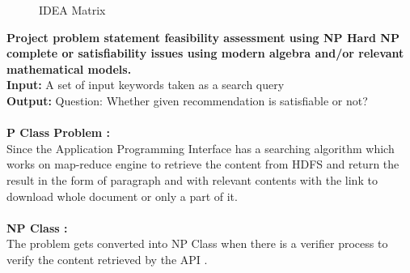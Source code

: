 \documentclass[oneside,a4paper,12pt]{report}
\begin{document}
{\begin{appendices}
  \begin{center}
	\begin{figure}[!htbp]
		\centering
	  \caption{IDEA Matrix}
	  \label{fig:arch-dig}
	\end{figure}
\end{center} 

\noindent  \textbf{Project problem statement feasibility assessment using NP Hard   NP complete or satisfiability issues  using modern algebra and/or relevant mathematical models.} \\

\noindent \textbf{Input:}  A set of input keywords taken as a search query  \\ 
\noindent \textbf{Output:} Question: Whether given recommendation is satisfiable or not? \\ \\

\noindent \textbf{P Class Problem : } \\
Since the Application Programming Interface has a searching algorithm which works on map-reduce engine to retrieve the content from HDFS and return the result in the form of paragraph and with relevant contents with the link to download whole document or only a part of it. \\ \\

\noindent \textbf{NP Class :} \\
The problem gets converted into NP Class when there is a verifier process to verify the content retrieved by the API . \\



\end{appendices}}
\end{document}

